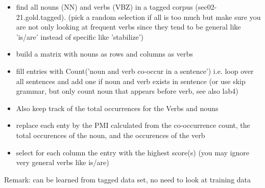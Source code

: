\begin{itemize}
\item find all nouns (NN) and verbs (VBZ) in a tagged corpus 
(sec02-21.gold.tagged).
(pick a random selection if all is too much
but make sure you are not only looking at
frequent verbs since they tend to be general like 'is/are'
instead of specific like 'stabilize')
\item  build a matrix with nouns as rows and columns as verbs
\item  fill entries with Count('noun and verb co-occur in a sentence')
i.e. loop over all sentences and add one if noun and verb exists in sentence
(or use skip grammar, but only count noun that appears before verb, see also lab4)
\item  Also keep track of the total occurrences for the Verbs and nouns
\item replace each enty by the PMI calculated from the 
co-occurrence count, the total occurences of the noun, and the occurences
of the verb
\item select for each column the entry with the highest score(s)
(you may ignore very general verbs like is/are)
\end{itemize}

Remark: can be learned from tagged data set, no need to look at training data





